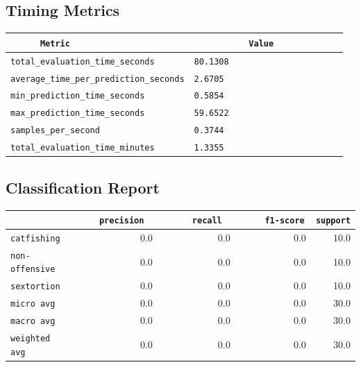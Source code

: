 \documentclass{article}
\begin{document}
\subsection{Timing Metrics}

\begin{center}
\begin{tabular}{l | l} \hline
    \verb|      Metric     | & \verb|           Value           | \\ \hline
    \hline
    \verb|total_evaluation_time_seconds| & \verb|80.1308                      | \\ \hline
    \verb|average_time_per_prediction_seconds| & \verb|2.6705                       | \\ \hline
    \verb|min_prediction_time_seconds| & \verb|0.5854                       | \\ \hline
    \verb|max_prediction_time_seconds| & \verb|59.6522                      | \\ \hline
    \verb|samples_per_second| & \verb|0.3744                       | \\ \hline
    \verb|total_evaluation_time_minutes| & \verb|1.3355                       | \\ \hline
\end{tabular}
\end{center}

\subsection{Classification Report}

\begin{center}
\begin{tabular}{l | r | r | r | r} \hline
    \verb|            | & \verb|    precision     | & \verb|      recall      | & \verb|     f1-score     | & \verb|support| \\ \hline
    \hline
    \verb|catfishing | & 0.0 & 0.0 & 0.0 &    10.0 \\ \hline
    \verb|non-offensive| & 0.0 & 0.0 & 0.0 &    10.0 \\ \hline
    \verb|sextortion | & 0.0 & 0.0 & 0.0 &    10.0 \\ \hline
    \verb|micro avg  | & 0.0 & 0.0 & 0.0 &    30.0 \\ \hline
    \verb|macro avg  | & 0.0 & 0.0 & 0.0 &    30.0 \\ \hline
    \verb|weighted avg| & 0.0 & 0.0 & 0.0 &    30.0 \\ \hline
\end{tabular}
\end{center}
\end{document}
